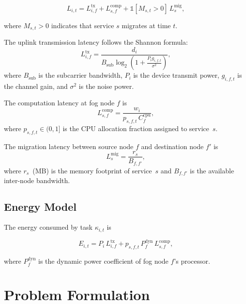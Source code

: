 \documentclass[conference]{IEEEtran}
\begin{document}
\begin{equation}
  L_{i,t} = L_{i,f}^{\mathrm{tx}} + L_{s,f}^{\mathrm{comp}} +
  \mathbb{1}[M_{s,t}>0]\,L_{s}^{\mathrm{mig}},
  \label{eq:latency}
\end{equation}

\noindent where $M_{s,t}>0$ indicates that service $s$ migrates at
time $t$.

The uplink transmission latency follows the Shannon formula:
\begin{equation}
  L_{i,f}^{\mathrm{tx}} = \frac{d_i}{B_{\mathrm{sub}} \log_2\!\left(1 +
  \frac{P_i g_{i,f,t}}{\sigma^2}\right)},
  \label{eq:tx_lat}
\end{equation}
where $B_{\mathrm{sub}}$ is the subcarrier bandwidth, $P_i$ is the
device transmit power, $g_{i,f,t}$ is the channel gain, and $\sigma^2$
is the noise power.

The computation latency at fog node $f$ is
\begin{equation}
  L_{s,f}^{\mathrm{comp}} = \frac{w_i}{p_{s,f,t}\,C_f^{\mathrm{cpu}}},
  \label{eq:comp_lat}
\end{equation}
where $p_{s,f,t} \in (0,1]$ is the CPU allocation fraction assigned
to service~$s$.

The migration latency between source node $f$ and destination node $f'$
is
\begin{equation}
  L_{s}^{\mathrm{mig}} = \frac{r_s}{B_{f,f'}},
  \label{eq:mig_lat}
\end{equation}
where $r_s$~(MB) is the memory footprint of service~$s$ and $B_{f,f'}$
is the available inter-node bandwidth.

\subsection{Energy Model}

The energy consumed by task $\kappa_{i,t}$ is

\begin{equation}
  E_{i,t} = P_i\,L_{i,f}^{\mathrm{tx}} +
             p_{s,f,t}\,P_f^{\mathrm{dyn}}\,L_{s,f}^{\mathrm{comp}},
  \label{eq:energy}
\end{equation}

\noindent where $P_f^{\mathrm{dyn}}$ is the dynamic power coefficient
of fog node $f$'s processor.

\section{Problem Formulation}
\label{sec:formulation}
\end{document}
